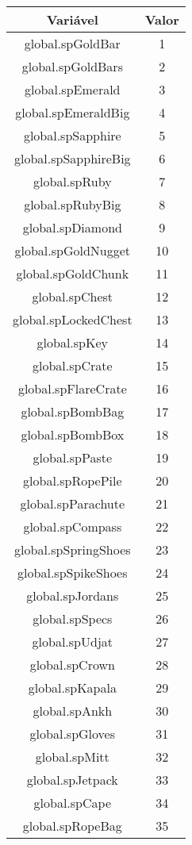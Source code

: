 \begin{center}
    \begin{tabular}{ |c|c| }
        \hline
        \textbf{Variável} & \textbf{Valor} \\ \hline
        global.spGoldBar & 1 \\ \hline
        global.spGoldBars & 2 \\ \hline
        global.spEmerald & 3 \\ \hline
        global.spEmeraldBig & 4 \\ \hline
        global.spSapphire & 5 \\ \hline
        global.spSapphireBig & 6 \\ \hline
        global.spRuby & 7 \\ \hline
        global.spRubyBig & 8 \\ \hline
        global.spDiamond & 9 \\ \hline
        global.spGoldNugget & 10 \\ \hline
        global.spGoldChunk & 11 \\ \hline
        global.spChest & 12 \\ \hline
        global.spLockedChest & 13 \\ \hline
        global.spKey & 14 \\ \hline
        global.spCrate & 15 \\ \hline
        global.spFlareCrate & 16 \\ \hline
        global.spBombBag & 17 \\ \hline
        global.spBombBox & 18 \\ \hline
        global.spPaste & 19 \\ \hline
        global.spRopePile & 20 \\ \hline
        global.spParachute & 21 \\ \hline
        global.spCompass & 22 \\ \hline
        global.spSpringShoes & 23 \\ \hline
        global.spSpikeShoes & 24 \\ \hline
        global.spJordans & 25 \\ \hline
        global.spSpecs & 26 \\ \hline
        global.spUdjat & 27 \\ \hline
        global.spCrown & 28 \\ \hline
        global.spKapala & 29 \\ \hline
        global.spAnkh & 30 \\ \hline
        global.spGloves & 31 \\ \hline
        global.spMitt & 32 \\ \hline
        global.spJetpack & 33 \\ \hline
        global.spCape & 34 \\ \hline
        global.spRopeBag & 35 \\ \hline
    \end{tabular}
\end{center}

